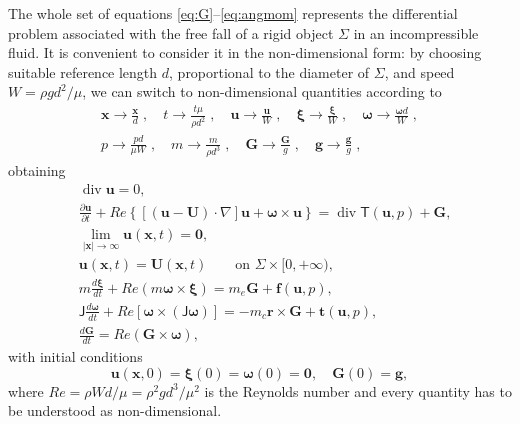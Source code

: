 \documentclass[final]{amsart}
\theoremstyle{definition}
\theoremstyle{definition}
\theoremstyle{remark}
\begin{document}
The whole set of equations \eqref{eq:G}--\eqref{eq:angmom} represents
the differential problem associated with the free fall of a rigid
object ${\Sigma}$ in an incompressible fluid. It is convenient to consider
it in the non-dimensional form: by choosing suitable reference length
$d$, proportional to the diameter of ${\Sigma}$, and speed $W=\rho
  g d^2/\mu$, we can switch to non-dimensional quantities
according to
\begin{gather*}
{\boldsymbol x}\to\frac{{\boldsymbol x}}{d}\;,\quad t\to\frac{t\mu}{\rho d^2}\;,\quad{\boldsymbol u}\to\frac{{\boldsymbol u}}{W}\;,\quad {\boldsymbol \xi}\to\frac{{\boldsymbol \xi}}{W}\;,\quad
{\boldsymbol \omega}\to\frac{{\boldsymbol \omega} d}{W}\;,\\
p\to\frac{pd}{\mu W}\;,\quad
m\to\frac{m}{\rho d^3}\;,\quad{\boldsymbol G}\to \frac{{\boldsymbol G}}{g}\;,\quad{\boldsymbol g}\to \frac{{\boldsymbol g}}{g}\;,
\end{gather*}
obtaining
\begin{align}
&{\operatorname{\mathrm{div}}}{\boldsymbol u}=0,\label{eq:nd1}\\
&\frac{{\partial}{\boldsymbol u}}{{\partial} t}+{\mathit{Re}}\left\{[({\boldsymbol u}-{\boldsymbol U})\cdot\nabla]{\boldsymbol u}+{\boldsymbol \omega}\times{\boldsymbol u}\right\}={\operatorname{\mathrm{div}}}{\mathsf T}({\boldsymbol u},p)+{\boldsymbol G},\label{eq:nd2}\\
&\lim_{|{\boldsymbol x}|\to\infty}{\boldsymbol u}({\boldsymbol x},t)={\boldsymbol 0},\\
&{\boldsymbol u}({\boldsymbol x},t)={\boldsymbol U}({\boldsymbol x},t)\qquad\text{on }{\Sigma}\times[0,+\infty),\label{eq:nd4}\\
&m\frac{d{\boldsymbol \xi}}{dt}+{\mathit{Re}}(m{\boldsymbol \omega}\times{\boldsymbol \xi})=
m_e{\boldsymbol G}+{\boldsymbol f}({\boldsymbol u},p),\label{eq:nd5}\\
&{\mathsf J}\frac{d{\boldsymbol \omega}}{dt}+{\mathit{Re}}[{\boldsymbol \omega}\times({\mathsf J}{\boldsymbol \omega})]=
-m_c{\boldsymbol r}\times{\boldsymbol G}+{\boldsymbol t}({\boldsymbol u},p),\label{eq:nd6}\\
&\frac{d{\boldsymbol G}}{dt}={\mathit{Re}}({\boldsymbol G}\times{\boldsymbol \omega}),\label{eq:nd7}
\end{align}
with initial conditions
\begin{equation}\label{eq:ic}
{\boldsymbol u}({\boldsymbol x},0)={\boldsymbol \xi}(0)={\boldsymbol \omega}(0)={\boldsymbol 0},\quad{\boldsymbol G}(0)={\boldsymbol g},
\end{equation}
where ${\mathit{Re}}=\rho Wd/\mu=\rho^2gd^3/\mu^2$ is the Reynolds number and every quantity has
to be understood as non-dimensional.
\end{document}
